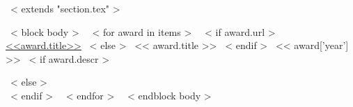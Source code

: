 ~< extends "section.tex" >~

~< block body >~
~< for award in items >~
  ~< if award.url >~
    \href{<<award.url>>}{<<award.title>>}
  ~< else >~
    << award.title >>
  ~< endif >~
  \hfill << award['year'] >>
  ~< if award.descr >~
    \\ {\scriptsize \color{gray}{<< award.descr >>} \par}
  ~< else >~
    \\[0.5mm]
  ~< endif >~
~< endfor >~
~< endblock body >~
